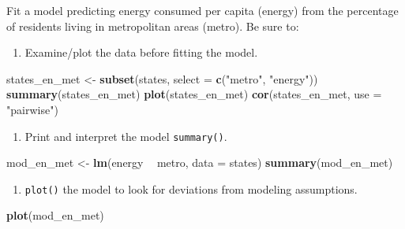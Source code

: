 \documentclass[]{book}
\newenvironment{Shaded}{\begin{snugshade}}{\end{snugshade}}
\newcommand{\KeywordTok}[1]{\textcolor[rgb]{0.13,0.29,0.53}{\textbf{#1}}}
\newcommand{\DataTypeTok}[1]{\textcolor[rgb]{0.13,0.29,0.53}{#1}}
\newcommand{\StringTok}[1]{\textcolor[rgb]{0.31,0.60,0.02}{#1}}
\newcommand{\OperatorTok}[1]{\textcolor[rgb]{0.81,0.36,0.00}{\textbf{#1}}}
\newcommand{\NormalTok}[1]{#1}
\providecommand{\tightlist}{%
  \setlength{\itemsep}{0pt}\setlength{\parskip}{0pt}}
\begin{document}
Fit a model predicting energy consumed per capita (energy) from the
percentage of residents living in metropolitan areas (metro). Be sure
to:

\begin{enumerate}
\def\labelenumi{\arabic{enumi}.}
\tightlist
\item
  Examine/plot the data before fitting the model.
\end{enumerate}

\begin{Shaded}
\begin{Highlighting}[]
\NormalTok{  states_en_met <-}\StringTok{ }\KeywordTok{subset}\NormalTok{(states, }\DataTypeTok{select =} \KeywordTok{c}\NormalTok{(}\StringTok{"metro"}\NormalTok{, }\StringTok{"energy"}\NormalTok{))}
  \KeywordTok{summary}\NormalTok{(states_en_met)}
  \KeywordTok{plot}\NormalTok{(states_en_met)}
  \KeywordTok{cor}\NormalTok{(states_en_met, }\DataTypeTok{use =} \StringTok{"pairwise"}\NormalTok{)}
\end{Highlighting}
\end{Shaded}

\begin{enumerate}
\def\labelenumi{\arabic{enumi}.}
\setcounter{enumi}{1}
\tightlist
\item
  Print and interpret the model \texttt{summary()}.
\end{enumerate}

\begin{Shaded}
\begin{Highlighting}[]
\NormalTok{  mod_en_met <-}\StringTok{ }\KeywordTok{lm}\NormalTok{(energy }\OperatorTok{~}\StringTok{ }\NormalTok{metro, }\DataTypeTok{data =}\NormalTok{ states)}
  \KeywordTok{summary}\NormalTok{(mod_en_met)}
\end{Highlighting}
\end{Shaded}

\begin{enumerate}
\def\labelenumi{\arabic{enumi}.}
\setcounter{enumi}{2}
\tightlist
\item
  \texttt{plot()} the model to look for deviations from modeling
  assumptions.
\end{enumerate}

\begin{Shaded}
\begin{Highlighting}[]
  \KeywordTok{plot}\NormalTok{(mod_en_met)}
\end{Highlighting}
\end{Shaded}
\end{document}
